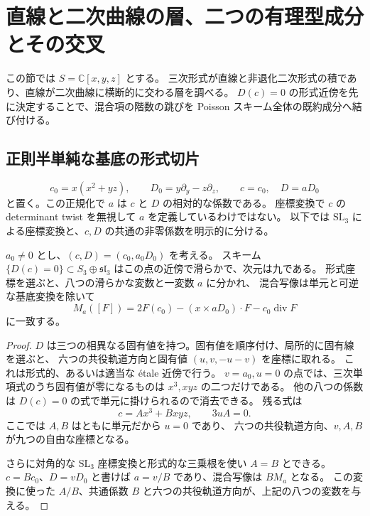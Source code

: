 \section{直線と二次曲線の層、二つの有理型成分とその交叉}
\label{sec:lineconic-v32}

この節では $S=\mathbb C[x,y,z]$ とする。
三次形式が直線と非退化二次形式の積であり、直線が二次曲線に横断的に交わる層を調べる。
$D(c)=0$ の形式近傍を先に決定することで、混合項の階数の跳びを
Poisson スキーム全体の既約成分へ結び付ける。

\subsection{正則半単純な基底の形式切片}

\[
 c_0=x(x^2+yz),\qquad D_0=y\partial_y-z\partial_z,
 \qquad c=c_0,\quad D=aD_0
\]
と置く。この正規化で $a$ は $c$ と $D$ の相対的な係数である。
座標変換で $c$ の determinant twist を無視して $a$ を定義しているわけではない。
以下では $\mathrm{SL}_3$ による座標変換と、$c,D$ の共通の非零係数を明示的に分ける。

\begin{lemma}[直線・二次曲線型の九次元基底]
\label{lem:lineconic-base-v32}
$a_0\ne0$ とし、$(c,D)=(c_0,a_0D_0)$ を考える。
スキーム $\{D(c)=0\}\subset S_3\oplus\mathfrak{sl}_3$ はこの点の近傍で滑らかで、次元は九である。
形式座標を選ぶと、八つの滑らかな変数と一変数 $a$ に分かれ、
混合写像は単元と可逆な基底変換を除いて
\[
 M_a([F])=2F(c_0)-(x\times aD_0)\cdot F-c_0\operatorname{div}F
\]
に一致する。
\end{lemma}

\begin{proof}
$D$ は三つの相異なる固有値を持つ。固有値を順序付け、局所的に固有線を選ぶと、
六つの共役軌道方向と固有値 $(u,v,-u-v)$ を座標に取れる。
これは形式的、あるいは適当な \'etale 近傍で行う。
$v=a_0,u=0$ の点では、三次単項式のうち固有値が零になるものは $x^3,xyz$ の二つだけである。
他の八つの係数は $D(c)=0$ の式で単元に掛けられるので消去できる。
残る式は
\[
 c=A x^3+Bxyz,\qquad 3uA=0.
\]
ここでは $A,B$ はともに単元だから $u=0$ であり、
六つの共役軌道方向、$v,A,B$ が九つの自由な座標となる。

さらに対角的な $\mathrm{SL}_3$ 座標変換と形式的な三乗根を使い $A=B$ とできる。
$c=Bc_0$、$D=vD_0$ と書けば $a=v/B$ であり、混合写像は $BM_a$ となる。
この変換に使った $A/B$、共通係数 $B$ と六つの共役軌道方向が、上記の八つの変数を与える。
\end{proof}

